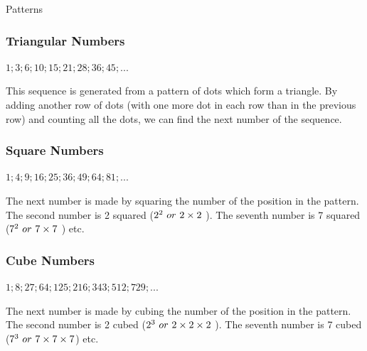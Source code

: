 \begin{exercises}{Patterns }
            \subsubsection*{ Triangular Numbers}
            \nopagebreak
          \label{m39364*id62915}
            $1;3;6;10;15;21;28;36;45;...$
          \par 
          \label{m39364*id62968}This sequence is generated from a pattern of dots which form a triangle.
By adding another row of dots (with one more dot in each row than in the previous row) and counting all the dots, we can find the next number of the sequence.\par 
        \label{m39364*uid11}
            \subsubsection*{ Square Numbers}
            \nopagebreak
          \label{m39364*id62984}
            $1;4;9;16;25;36;49;64;81;...$
          \par 
          \label{m39364*id63037}The next number is made by squaring the number of the position in the pattern.
The second number is 2 squared (${2}^{2}\phantom{\rule{3.33333pt}{0ex}}or\phantom{\rule{3.33333pt}{0ex}}2\ensuremath{\times}2$ \hspace{1ex}). 
The seventh number is 7 squared (${7}^{2}\phantom{\rule{3.33333pt}{0ex}}or\phantom{\rule{3.33333pt}{0ex}}7\ensuremath{\times}7$  \hspace{1ex} ) etc.\par 
        \label{m39364*uid12}
            \subsubsection*{ Cube Numbers}
            \nopagebreak
          \label{m39364*id63115}
            $1;8;27;64;125;216;343;512;729;...$
          \par 
          \label{m39364*id63168}The next number is made by cubing the number of the position in the pattern.
The second number is 2 cubed (${2}^{3}\phantom{\rule{3.33333pt}{0ex}}or\phantom{\rule{3.33333pt}{0ex}}2\ensuremath{\times}2\ensuremath{\times}2$ \hspace{1ex}).
The seventh number is 7 cubed (${7}^{3}\phantom{\rule{3.33333pt}{0ex}}or\phantom{\rule{3.33333pt}{0ex}}7\ensuremath{\times}7\ensuremath{\times}7$\hspace{2ex}) etc.\par 
        \label{m39364*uid13}

\end{exercises}
